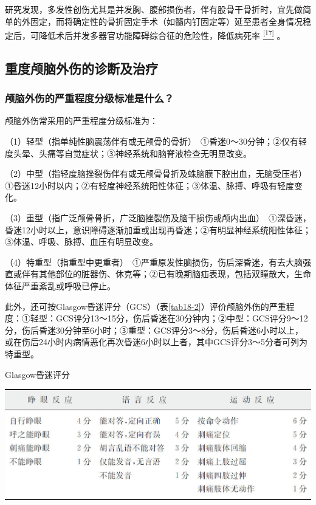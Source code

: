 研究发现，多发性创伤尤其是并发胸、腹部损伤者，伴有股骨干骨折时，宜先做简单的外固定，而将确定性的骨折固定手术（如髓内钉固定等）延至患者全身情况稳定后，可降低术后并发多器官功能障碍综合征的危险性，降低病死率
\protect\hyperlink{text00024.htmlux5cux23ch17-23}{\textsuperscript{{[}17{]}}}
。

\subsection{重度颅脑外伤的诊断及治疗}

\subsubsection{颅脑外伤的严重程度分级标准是什么？}

颅脑外伤常采用的严重程度分级标准为：

（1）轻型（指单纯性脑震荡伴有或无颅骨的骨折）　①昏迷0～30分钟；②仅有轻度头晕、头痛等自觉症状；③神经系统和脑脊液检查无明显改变。

（2）中型（指轻度脑挫裂伤伴有或无颅骨骨折及蛛脑膜下腔出血，无脑受压者）　①昏迷12小时以内；②有轻度神经系统阳性体征；③体温、脉搏、呼吸有轻度变化。

（3）重型（指广泛颅骨骨折，广泛脑挫裂伤及脑干损伤或颅内出血）　①深昏迷，昏迷12小时以上，意识障碍逐渐加重或出现再昏迷；②有明显神经系统阳性体征；③体温、呼吸、脉搏、血压有明显改变。

（4）特重型（指重型中更重者）　①严重原发性脑损伤，伤后深昏迷，有去大脑强直或伴有其他部位的脏器伤、休克等；②已有晚期脑疝表现，包括双瞳散大，生命体征严重紊乱或呼吸已停止。

此外，还可按Glasgow昏迷评分（GCS）（表\ref{tab18-2}）评价颅脑外伤的严重程度：①轻型：GCS评分13～15分，伤后昏迷在30分钟内；②中型：GCS评分9～12分，伤后昏迷30分钟至6小时；③重型：GCS评分3～8分，伤后昏迷6小时以上，或在伤后24小时内病情恶化再次昏迷6小时以上者，其中GCS评分3～5分者可列为特重型。

\begin{table}[htbp]
\centering
\caption{Glasgow昏迷评分}
\label{tab18-2}
\includegraphics{./images/Image00142.jpg}
\end{table}

